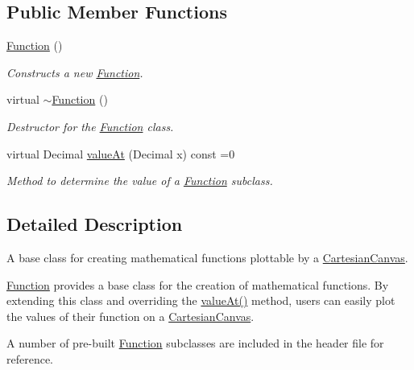 \subsection*{\-Public \-Member \-Functions}
\begin{DoxyCompactItemize}
\item 
\hyperlink{classtsgl_1_1_function_aaf959c9d39bb45c2aded83fd754c288d}{\-Function} ()
\begin{DoxyCompactList}\small\item\em \-Constructs a new \hyperlink{classtsgl_1_1_function}{\-Function}. \end{DoxyCompactList}\item 
virtual \hyperlink{classtsgl_1_1_function_a3b8cbd26a32c6ae75b12e7397bb42c41}{$\sim$\-Function} ()
\begin{DoxyCompactList}\small\item\em \-Destructor for the \hyperlink{classtsgl_1_1_function}{\-Function} class. \end{DoxyCompactList}\item 
virtual \-Decimal \hyperlink{classtsgl_1_1_function_affb7b3b19a04efefa29a9870d666e912}{value\-At} (\-Decimal x) const =0
\begin{DoxyCompactList}\small\item\em \-Method to determine the value of a \hyperlink{classtsgl_1_1_function}{\-Function} subclass. \end{DoxyCompactList}\end{DoxyCompactItemize}


\subsection{\-Detailed \-Description}
\-A base class for creating mathematical functions plottable by a \hyperlink{classtsgl_1_1_cartesian_canvas}{\-Cartesian\-Canvas}. 

\hyperlink{classtsgl_1_1_function}{\-Function} provides a base class for the creation of mathematical functions. \-By extending this class and overriding the \hyperlink{classtsgl_1_1_function_affb7b3b19a04efefa29a9870d666e912}{value\-At()} method, users can easily plot the values of their function on a \hyperlink{classtsgl_1_1_cartesian_canvas}{\-Cartesian\-Canvas}.

\-A number of pre-\/built \hyperlink{classtsgl_1_1_function}{\-Function} subclasses are included in the header file for reference. 

